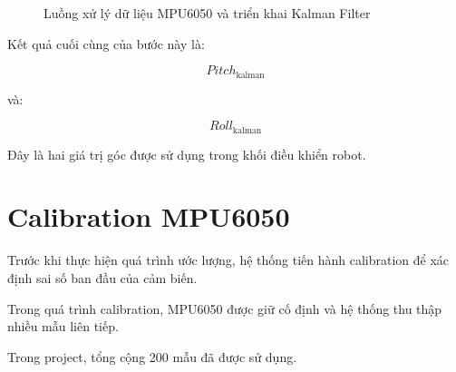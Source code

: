 \documentclass[a4paper,12pt]{report}
\begin{document}
\begin{figure}[H]

    \caption{Luồng xử lý dữ liệu MPU6050 và triển khai Kalman Filter}
    \label{fig:mpu6050_kalman}
\end{figure}

Kết quả cuối cùng của bước này là:

\begin{equation}
Pitch_{\text{kalman}}
\end{equation}

và:

\begin{equation}
Roll_{\text{kalman}}
\end{equation}

Đây là hai giá trị góc được sử dụng trong khối điều khiển robot.


\section{Calibration MPU6050}
\label{sec:calibration}

Trước khi thực hiện quá trình ước lượng, hệ thống tiến hành calibration để xác định sai số ban đầu của cảm biến.

Trong quá trình calibration, MPU6050 được giữ cố định và hệ thống thu thập nhiều mẫu liên tiếp.

Trong project, tổng cộng 200 mẫu đã được sử dụng.

\end{document}
